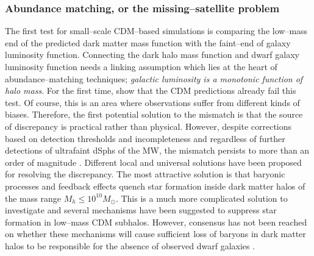 \documentclass[paper=a4, fontsize=11pt]{scrartcl} %
\numberwithin{equation}{section} %
\numberwithin{figure}{section} %
\numberwithin{table}{section} %
\begin{document}
\subsubsection{Abundance matching, or the missing--satellite problem}
\label{subsec:missing-satellite}
The first test for small--scale CDM--based simulations is comparing the low--mass end of the predicted dark matter mass function with the faint--end of galaxy luminosity function. Connecting the dark halo mass function and dwarf galaxy luminosity function needs a linking assumption which lies at the heart of abundance--matching techniques; \emph{galactic luminosity is a monotonic function of halo mass}. For the first time, \citet[][]{Klypin+1999, Moore+1999} show that the CDM predictions already fail this test. Of course, this is an area where observations suffer from different kinds of biases. Therefore, the first potential solution to the mismatch is that the source of discrepancy is practical rather than physical. However, despite corrections based on detection thresholds and incompleteness and regardless of further detections of ultrafaint dSphs of the MW, the mismatch persists to more than an order of magnitude \citep[See e.g.][]{Pawlowski+2015}. Different local and universal solutions have been proposed for resolving the discrepancy. The most attractive solution is that baryonic processes and feedback effects quench star formation inside dark matter halos of the mass range $M_h \leq 10^{10} M_\odot$. This is a much more complicated solution to investigate and several mechanisms have been suggested to suppress star formation in low--mass CDM subhalos. However, consensus has not been reached on whether these mechanisms will cause sufficient loss of baryons in dark matter halos to be responsible for the absence of observed dwarf galaxies \citep[See e.g. \citet{Brooks+2013, Sawala+2014, DelPopolo+2014} claiming to have found baryonic solutions to the problem, but also for opposite arguments see \citet{Bullock+2010, Klypin+2015}][]{}.

 
\end{document}
